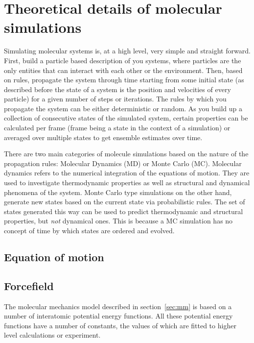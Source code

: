\documentclass{report}
\begin{document}
\section{Theoretical details of molecular simulations}

Simulating molecular systems is, at a high level, very simple and straight forward. First, build a particle based description of you systems, where particles are the only entities that can interact with each other or the environment. Then, based on rules, propagate the system through time starting from some initial state (as described before the state of a system is the position and velocities of every particle) for a given number of steps or iterations. The rules by which you propagate the system can be either deterministic or random. As you build up a collection of consecutive states of the simulated system, certain properties can be calculated per frame (frame being a state in the context of a simulation) or averaged over multiple states to get ensemble estimates over time. 

There are two main categories of molecule simulations based on the nature of the propagation rules: Molecular Dynamics (MD) or Monte Carlo (MC). Molecular dynamics refers to the numerical integration of the equations of motion. They are used to investigate thermodynamic properties as well as structural and dynamical phenomena of the system. Monte Carlo type simulations on the other hand, generate new states based on the current state via probabilistic rules. The set of states generated this way can be used to predict thermodynamic and structural properties, but \emph{not} dynamical ones. This is because a MC simulation has no concept of time by which states are ordered and evolved.

\subsection{Equation of motion}

\subsection{Forcefield}

The molecular mechanics model described in section~\ref{sec:mm} is based on a number of interatomic potential energy functions. All these potential energy functions have a number of constants, the values of which are fitted to higher level calculations or experiment.
\end{document}
